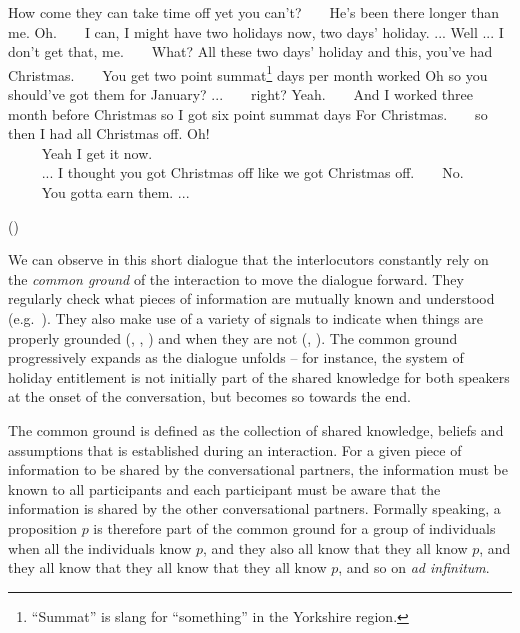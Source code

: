 \begin{dialogue} 
 How come they can take time off yet you can't?
 $\ \ \ \ \ \ $ He's been there longer than me.
 Oh.
  $\ \ \ \ \ \ $ I can, I might have two holidays now, two days' holiday. ...
 Well ... I don't get that, me.
  $\ \ \ \ \ \ $ What?
 All these two days' holiday and this, you've had Christmas.
  $\ \ \ \ \ \ $ You get two point summat\footnote{``Summat'' is slang for ``something'' in the Yorkshire region. } days per month worked
 Oh so you should've got them for January? ...
  $\ \ \ \ \ \ $ right?
 Yeah.
  $\ \ \ \ \ \ $ And I worked three month before Christmas so I got six point summat days
 For Christmas.
  $\ \ \ \ \ \ $ so then I had all Christmas off.
 Oh! \\
 $\phantom{a} \ \ \ \ \ \ \ $ Yeah I get it now. \\
 $\phantom{a} \ \ \ \ \ \ \ $ ... I thought you got Christmas off like we got Christmas off.
  $\ \ \ \ \ \ $ No. \\ 
 $\phantom{a} \ \ \ \ \ \ \ $ You gotta earn them. ... \vspace{-2mm}
 \begin{flushright}\begin{scriptsize}()\end{scriptsize}\end{flushright} 
\end{dialogue} 

We can observe in this short dialogue that the interlocutors constantly rely on the \textit{common ground} of the interaction to move the dialogue forward.  They regularly check what pieces of information are mutually known and understood (e.g.\ ).  They also make use of a variety of signals to indicate when things are properly grounded (, , ) and when they are not (, ). The common ground progressively expands as the dialogue unfolds -- for instance, the system of holiday entitlement is not initially part of the shared knowledge for both speakers at the onset of the conversation, but becomes so towards the end. 

The common ground is defined as the collection of shared knowledge, beliefs and assumptions that is established during an interaction. For a given piece of information to be shared by the conversational partners, the information must be known to all participants and each participant must be aware that the information is shared by the other conversational partners. Formally speaking, a proposition $p$ is therefore part of the common ground for a group of individuals when all the individuals know $p$, and they also all know that they all know $p$, and they all know that they all know that they all know $p$, and so on \textit{ad infinitum}.

